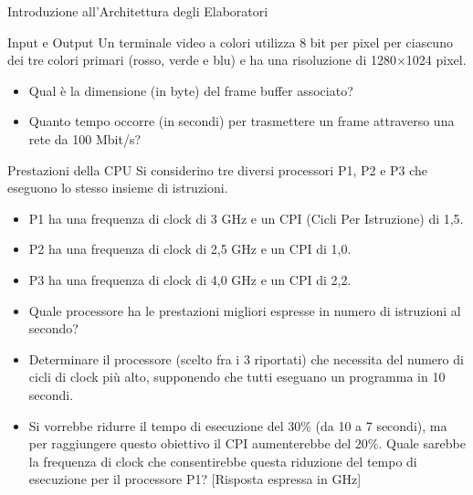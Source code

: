 \documentclass[11pt]{article}
\begin{document}
\begin{quiz}{Introduzione all'Architettura degli Elaboratori}
\begin{cloze}[points=1,shuffle=false]{Input e Output}
Un terminale video a colori utilizza 8 bit per pixel per ciascuno dei tre colori primari (rosso, verde e blu) e ha una risoluzione di 1280×1024 pixel.

\begin{itemize}
\item Qual è la dimensione (in byte) del frame buffer associato? 
\item Quanto tempo occorre (in secondi) per trasmettere un frame attraverso una rete da 100 Mbit/s?
\end{itemize}
\end{cloze}

\begin{cloze}[points=1,shuffle=false]{Prestazioni della CPU}
Si considerino tre diversi processori P1, P2 e P3 che eseguono lo stesso insieme di istruzioni. 
\begin{itemize}
    \item P1 ha una frequenza di clock di 3 GHz e un CPI (Cicli Per Istruzione) di 1,5.
    \item P2 ha una frequenza di clock di 2,5 GHz e un CPI di 1,0.
    \item P3 ha una frequenza di clock di 4,0 GHz e un CPI di 2,2.
\end{itemize}
   
\begin{itemize}
\item Quale processore ha le prestazioni migliori espresse in numero di istruzioni al secondo? 
%
\item Determinare il processore (scelto fra i 3 riportati) che necessita del numero di cicli di clock più alto, supponendo che tutti eseguano un programma in 10 secondi.
%
\item Si vorrebbe ridurre il tempo di esecuzione del 30\% (da 10 a 7 secondi), ma per raggiungere questo obiettivo il CPI aumenterebbe del 20\%. Quale sarebbe la frequenza di clock che consentirebbe questa riduzione del tempo di esecuzione per il processore P1? [Risposta espressa in GHz]
\end{itemize}
\end{cloze}


\end{quiz}
\end{document}
